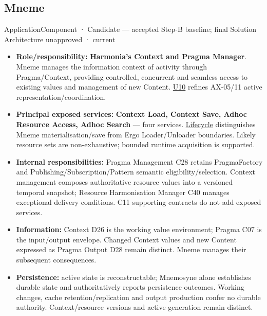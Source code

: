 \subsection{Mneme}

\label{element:1af8a56358f7429fabfb57be66542a99}
{\small ApplicationComponent · Candidate — accepted Step-B baseline; final Solution Architecture unapproved · current}\par

\begin{itemize}


\item \textbf{Role/responsibility:} \textbf{Harmonia's Context and Pragma Manager}. Mneme manages
  the information context of activity through Pragma/Context, providing controlled,
  concurrent and seamless access to existing values and management of new Content.
  \href{\detokenize{../../../../../docs/markdown/05-information-systems-architecture/sources.md#u10}}{U10} refines AX-05/11 active representation/coordination.

\item \textbf{Principal exposed services:} \textbf{Context Load, Context Save, Adhoc Resource
  Access, Adhoc Search} — four services. \hyperref[element:49c9eb2bef0c47b8b5328621d5fc5479]{Lifecycle}
  distinguishes Mneme materialisation/save from Ergo Loader/Unloader boundaries.
  Likely resource sets are non-exhaustive; bounded runtime acquisition is supported.

\item \textbf{Internal responsibilities:} Pragma Management C28 retains PragmaFactory and
  Publishing/Subscription/Pattern semantic eligibility/selection. Context management
  composes authoritative resource values into a versioned temporal snapshot;
  Resource Harmonisation Manager C40 manages exceptional delivery conditions.
  C11 supporting contracts do not add exposed services.

\item \textbf{Information:} Context D26 is the working value environment; Pragma C07 is
  the input/output envelope. Changed Context values and new Content expressed as
  Pragma Output D28 remain distinct. Mneme manages their subsequent consequences.

\item \textbf{Persistence:} active state is reconstructable; Mnemosyne alone establishes
  durable state and authoritatively reports persistence outcomes. Working changes,
  cache retention/replication and output production confer no durable authority.
  Context/resource versions and active generation remain distinct.


\end{itemize}
